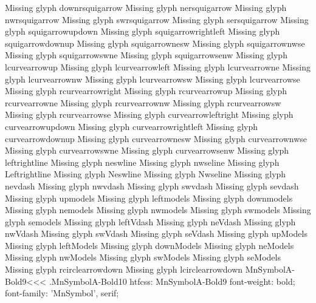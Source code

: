 Missing glyph	downrsquigarrow
Missing glyph	nersquigarrow
Missing glyph	nwrsquigarrow
Missing glyph	swrsquigarrow
Missing glyph	sersquigarrow
Missing glyph	squigarrowupdown
Missing glyph	squigarrowrightleft
Missing glyph	squigarrowdownup
Missing glyph	squigarrownesw
Missing glyph	squigarrownwse
Missing glyph	squigarrowswne
Missing glyph	squigarrowsenw
Missing glyph	lcurvearrowup
Missing glyph	lcurvearrowleft
Missing glyph	lcurvearrowne
Missing glyph	lcurvearrownw
Missing glyph	lcurvearrowsw
Missing glyph	lcurvearrowse
Missing glyph	rcurvearrowright
Missing glyph	rcurvearrowup
Missing glyph	rcurvearrowne
Missing glyph	rcurvearrownw
Missing glyph	rcurvearrowsw
Missing glyph	rcurvearrowse
Missing glyph	curvearrowleftright
Missing glyph	curvearrowupdown
Missing glyph	curvearrowrightleft
Missing glyph	curvearrowdownup
Missing glyph	curvearrownesw
Missing glyph	curvearrownwse
Missing glyph	curvearrowswne
Missing glyph	curvearrowsenw
Missing glyph	leftrightline
Missing glyph	neswline
Missing glyph	nwseline
Missing glyph	Leftrightline
Missing glyph	Neswline
Missing glyph	Nwseline
Missing glyph	nevdash
Missing glyph	nwvdash
Missing glyph	swvdash
Missing glyph	sevdash
Missing glyph	upmodels
Missing glyph	leftmodels
Missing glyph	downmodels
Missing glyph	nemodels
Missing glyph	nwmodels
Missing glyph	swmodels
Missing glyph	semodels
Missing glyph	leftVdash
Missing glyph	neVdash
Missing glyph	nwVdash
Missing glyph	swVdash
Missing glyph	seVdash
Missing glyph	upModels
Missing glyph	leftModels
Missing glyph	downModels
Missing glyph	neModels
Missing glyph	nwModels
Missing glyph	swModels
Missing glyph	seModels
Missing glyph	rcirclearrowdown
Missing glyph	lcirclearrowdown
\<MnSymbolA-Bold9\><<<
.MnSymbolA-Bold10
htfcss:  MnSymbolA-Bold9  font-weight: bold; font-family: 'MnSymbol', serif;

